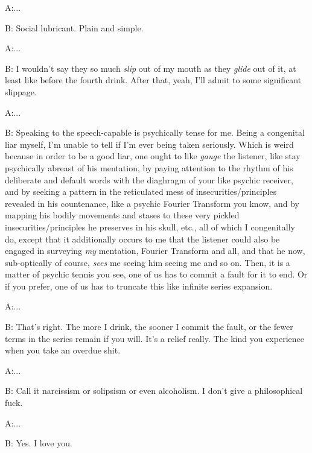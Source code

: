 \documentclass{article}
\begin{document}
\newline

A:...

B: Social lubricant. Plain and simple.
\newline
\newline

A:...

B: I wouldn't say they so much \textit{slip} out of my mouth as they
\textit{glide} out of it, at least like before the fourth drink. After
that, yeah, I'll admit to some significant slippage. \newline
\newline
\newline

A:...

B: Speaking to the speech-capable is psychically tense for me. Being
a congenital liar myself, I'm unable to tell if I'm ever being taken
seriously. Which is weird because in order to be a good liar, one ought
to like \textit{gauge} the listener, like stay psychically abreast of
his mentation, by paying attention to the rhythm of his deliberate and
default words with the diaghragm of your like psychic receiver, and by
seeking a pattern in the reticulated mess of insecurities/principles
revealed in his countenance, like a psychic Fourier Transform you know,
and by mapping his bodily movements and stases to these very pickled
insecurities/principles he preserves in his skull, etc., all of which
I congenitally do, except that it additionally occurs to me that the
listener could also be engaged in surveying \textit{my} mentation,
Fourier Transform and all, and that he now, sub-optically of course,
\textit{sees} me seeing him seeing me and so on. Then, it is a matter of
psychic tennis you see, one of us has to commit a fault for it to end.
Or if you prefer, one of us has to truncate this like infinite series
expansion. \newline \newline

A:...

B: That's right. The more I drink, the sooner I commit the fault, or the
fewer terms in the series remain if you will. It's a relief really. The
kind you experience when you take an overdue shit. \newline \newline

A:...

B: Call it narcissism or solipsism or even alcoholism. I don't give
a philosophical fuck.
\newline
\newline

A:...

B: Yes. I love you.
\newline
\newline
\end{document}
